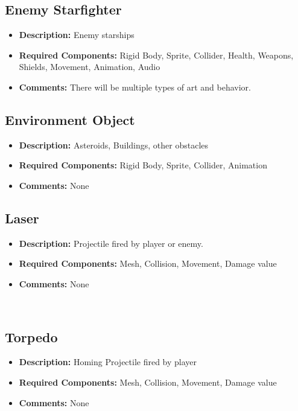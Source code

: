 \documentclass[journal]{IEEEtran}
\begin{document}
\subsection{Enemy Starfighter}

\begin{itemize}
    \item \textbf{Description:} Enemy starships
    \item \textbf{Required Components: } Rigid Body, Sprite, Collider, Health, Weapons, Shields, Movement, Animation, Audio
    \item \textbf{Comments: } There will be multiple types of art and behavior.
\end{itemize}

\subsection{Environment Object}

\begin{itemize}
    \item \textbf{Description:} Asteroids, Buildings, other obstacles
    \item \textbf{Required Components: } Rigid Body, Sprite, Collider, Animation
    \item \textbf{Comments: } None
\end{itemize}

\subsection{Laser}

\begin{itemize}
    \item \textbf{Description:} Projectile fired by player or enemy. 
    \item \textbf{Required Components: } Mesh, Collision, Movement, Damage value
    \item \textbf{Comments: } None
\end{itemize}\

\subsection{Torpedo}

\begin{itemize}
    \item \textbf{Description:} Homing Projectile fired by player
    \item \textbf{Required Components: } Mesh, Collision, Movement, Damage value
    \item \textbf{Comments: } None
\end{itemize}
\end{document}
